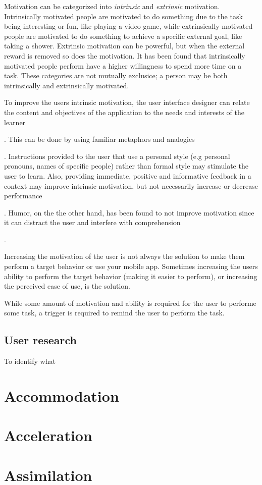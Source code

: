 Motivation can be categorized into \textit{intrinsic} and \textit{extrinsic} motivation. Intrinsically motivated people are motivated to do something due to the task being interesting or fun, like playing a video game, while extrinsically motivated people are motivated to do something to achieve a specific external goal, like taking a shower. Extrinsic motivation can be powerful, but when the external reward is removed so does the motivation. It has been found that intrinsically motivated people perform have a higher willingness to spend more time on a task. These categories are not mutually exclusice; a person may be both intrinsically and extrinsically motivated.

To improve the users intrinsic motivation, the user interface designer can relate the content and objectives of the application to the needs and interests of the learner . This can be done by using familiar metaphors and analogies . Instructions provided to the user that use a personal style (e.g personal pronouns, names of specific people) rather than formal style may stimulate the user to learn. Also, providing immediate, positive and informative feedback in a context may improve intrinsic motivation, but not necessarily increase or decrease performance . Humor, on the the other hand, has been found to not improve motivation since it can distract the user and interfere with comprehension .

Increasing the motivation of the user is not always the solution to make them perform a target behavior or use your mobile app. Sometimes increasing the users ability to perform the target behavior (making it easier to perform), or increasing the perceived ease of use, is the solution.

While some amount of motivation and ability is required for the user to performe some task, a trigger is required to remind the user to perform the task.

\subsection{User research}
To identify what

\section{Accommodation}

\section{Acceleration}

\section{Assimilation}
